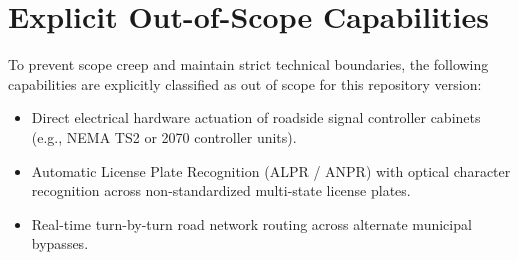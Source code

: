\section{Explicit Out-of-Scope Capabilities}
To prevent scope creep and maintain strict technical boundaries, the following capabilities are explicitly classified as out of scope for this repository version:
\begin{itemize}[leftmargin=*]
    \item Direct electrical hardware actuation of roadside signal controller cabinets (e.g., NEMA TS2 or 2070 controller units).
    \item Automatic License Plate Recognition (ALPR / ANPR) with optical character recognition across non-standardized multi-state license plates.
    \item Real-time turn-by-turn road network routing across alternate municipal bypasses.
\end{itemize}
